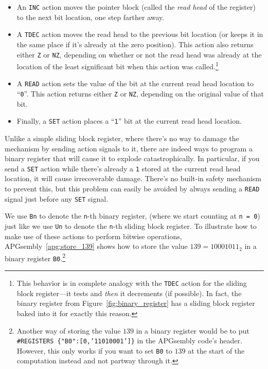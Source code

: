 \begin{itemize}
	\item An \texttt{INC} action moves the pointer block (called the \emph{read head} of the register) to the next bit location, one step farther away.\smallskip
	
	\item A \texttt{TDEC} action moves the read head to the previous bit location (or keeps it in the same place if it's already at the zero position). This action also returns either \texttt{Z} or \texttt{NZ}, depending on whether or not the read head was already at the location of the least significant bit when this action was called.\footnote{This behavior is in complete analogy with the \texttt{TDEC} action for the sliding block register---it tests and \emph{then} it decrements (if possible). In fact, the binary register from Figure~\ref{fig:binary_register} has a sliding block register baked into it for exactly this reason.}\smallskip
	
	\item A \texttt{READ} action sets the value of the bit at the current read head location to ``\texttt{0}''. This action returns either \texttt{Z} or \texttt{NZ}, depending on the original value of that bit.\smallskip
	
	\item Finally, a \texttt{SET} action places a ``\texttt{1}'' bit at the current read head location.\smallskip
\end{itemize}

Unlike a simple sliding block register, where there's no way to damage the mechanism by sending action signals to it, there are indeed ways to program a binary register that will cause it to explode catastrophically. In particular, if you send a \texttt{SET} action while there's already a \texttt{1} stored at the current read head location, it will cause irrecoverable damage. There's no built-in safety mechanism to prevent this, but this problem can easily be avoided by always sending a \texttt{READ} signal just before any \texttt{SET} signal.

We use \texttt{Bn} to denote the \texttt{n}-th binary register, (where we start counting at \texttt{n = 0}) just like we use \texttt{Un} to denote the \texttt{n}-th sliding block register. To illustrate how to make use of these actions to perform bitwise operations, APGsembly~\ref{apg:store_139} shows how to store the value $139 = 10001011_2$ in a binary register \texttt{B0}.\footnote{Another way of storing the value $139$ in a binary register would be to put \texttt{\#REGISTERS \{"B0":[0,'11010001']\}} in the APGsembly code's header. However, this only works if you want to set \texttt{B0} to $139$ at the start of the computation instead and not partway through it.}

